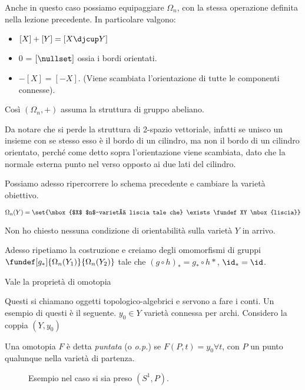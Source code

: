 \begin{oss}
 Anche in questo caso possiamo equipaggiare $\Omega _n$, con la stessa operazione definita nella lezione precedente.
 In particolare valgono:
 \begin{itemize}
  \item $\left [ X \right ] + \left [ Y \right ] = \left [ X \djcup Y \right ]$
  \item 0 = $\left [ \nullset \right ]$ ossia i bordi orientati.
  \item $-\left[ X\right]=\left[-X\right]$. (Viene scambiata l'orientazione di tutte le componenti connesse).
 \end{itemize}
 Così $(\Omega _n, +)$ assuma la struttura di gruppo abeliano.

 Da notare che si perde la struttura di 2-spazio vettoriale, infatti se unisco un insieme con se stesso esso è il bordo di un cilindro, ma non il bordo di un cilindro orientato, perché come detto sopra l'orientazione viene scambiata, dato che la normale esterna punto nel verso opposto ai due lati del cilindro.
\end{oss}
Possiamo adesso ripercorrere lo schema precedente e cambiare la varietà obiettivo.
\begin{defn}
 $\Omega_n (Y) = \set{\mbox{$X$ $n$-varietà liscia tale che} \exists \fundef XY \mbox{liscia}}$
\end{defn}
\begin{oss}
 Non ho chiesto nessuna condizione di orientabilità sulla varietà $Y$ in arrivo.
\end{oss}
Adesso ripetiamo la costruzione e creiamo degli omomorfismi di gruppi $\fundef[g_*]{\Omega _n (Y_1)}{\Omega _n(Y_2)}$ tale che $(g\circ h )_* = g_*\circ h*$,
 $\id_* = \id$.
\begin{teo}
 Vale la proprietà di omotopia
\end{teo}
Questi si chiamano oggetti topologico-algebrici e servono a fare i conti. Un esempio di questi è il seguente.
$y_0\in Y$ varietà connessa per archi. Considero la coppia $(Y, y_0)$
\begin{defn}
Una omotopia $F$ è detta \emph{puntata} (o \emph{o.p.}) se $F(P, t) = y_0 \forall t$, con $P$ un punto qualunque nella varietà di partenza.
 \begin{figure}
  \centering
  
  \caption{Esempio nel caso si sia preso $(S^1, P).$}
 \end{figure}
\end{defn}

